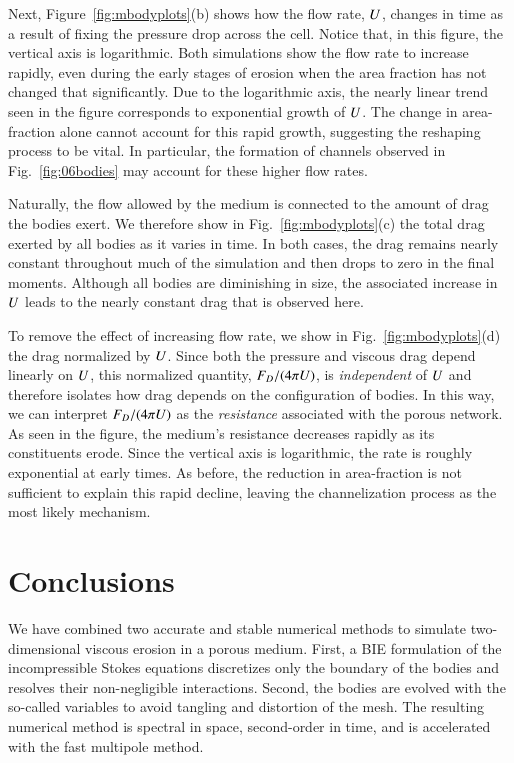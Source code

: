 \documentclass[preprint, 10pt]{elsarticle}
\begin{document}
Next, Figure~\ref{fig:mbodyplots}(b) shows how the flow rate, $U$, changes in time as a result of fixing the pressure drop across the cell. Notice that, in this figure, the vertical axis is logarithmic. Both simulations show the flow rate to increase rapidly, even during the early stages of erosion when the area fraction has not changed that significantly. Due to the logarithmic axis, the nearly linear trend seen in the figure corresponds to exponential growth of $U$. The change in area-fraction alone cannot account for this rapid growth, suggesting the reshaping process to be vital. In particular, the formation of channels observed in Fig.~\ref{fig:06bodies} may account for these higher flow rates.

Naturally, the flow allowed by the medium is connected to the amount of drag the bodies exert. We therefore show in Fig.~\ref{fig:mbodyplots}(c) the total drag exerted by all bodies as it varies in time. In both cases, the drag remains nearly constant throughout much of the simulation and then drops to zero in the final moments. Although all bodies are diminishing in size, the associated increase in $U$ leads to the nearly constant drag that is observed here.

To remove the effect of increasing flow rate, we show in Fig.~\ref{fig:mbodyplots}(d) the drag normalized by $U$. Since both the pressure and viscous drag depend linearly on $U$, this normalized quantity, $F_D / (4 \pi U)$, is {\em independent} of $U$ and therefore isolates how drag depends on the configuration of bodies. In this way, we can interpret $F_D / (4 \pi U)$ as the {\em resistance} associated with the porous network. As seen in the figure, the medium's resistance decreases rapidly as its constituents erode. Since the vertical axis is logarithmic, the rate is roughly exponential at early times. As before, the reduction in area-fraction is not sufficient to explain this rapid decline, leaving the channelization process as the most likely mechanism.



\section{Conclusions\label{s:conclusions}}
We have combined two accurate and stable numerical methods to simulate
two-dimensional viscous erosion in a porous medium.  First, a BIE
formulation of the incompressible Stokes equations discretizes only the
boundary of the bodies and resolves their non-negligible interactions.
Second, the bodies are evolved with the so-called {\thL} variables to
avoid tangling and distortion of the mesh.  The resulting numerical
method is spectral in space, second-order in time, and is accelerated
with the fast multipole method.
\end{document}
